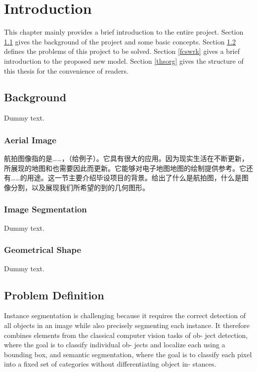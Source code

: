 \chapter{Introduction}

This chapter mainly provides a brief introduction to the entire project. Section \ref{bckgrd} gives the background of the project and some basic concepts. Section \ref{prodef} defines the problems of this project to be solved. Section \ref{fcswrk} gives a brief introduction to the proposed new model. Section \ref{thsorg} gives the structure of this thesis for the convenience of readers.

\section{Background}\label{bckgrd}

Dummy text.

\subsection{Aerial Image}

航拍图像指的是……，（给例子）。它具有很大的应用。因为现实生活在不断更新，所展现的地图和也需要因此而更新。它能够对电子地图地图的绘制提供参考。它还有……的用途。这一节主要介绍毕设项目的背景。给出了什么是航拍图，什么是图像分割，以及展现我们所希望的到的几何图形。


\subsection{Image Segmentation}

Dummy text.

\subsection{Geometrical Shape}

Dummy text.

\section{Problem Definition}\label{prodef}




Instance segmentation is challenging because it requires the correct detection of all objects in an image while also precisely segmenting each instance. It therefore combines elements from the classical computer vision tasks of ob- ject detection, where the goal is to classify individual ob- jects and localize each using a bounding box, and semantic segmentation, where the goal is to classify each pixel into a fixed set of categories without differentiating object in- stances.
